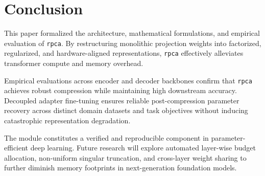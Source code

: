 \section{Conclusion}
This paper formalized the architecture, mathematical formulations, and empirical evaluation of \texttt{rpca}. By restructuring monolithic projection weights into factorized, regularized, and hardware-aligned representations, \texttt{rpca} effectively alleviates transformer compute and memory overhead.

Empirical evaluations across encoder and decoder backbones confirm that \texttt{rpca} achieves robust compression while maintaining high downstream accuracy. Decoupled adapter fine-tuning ensures reliable post-compression parameter recovery across distinct domain datasets and task objectives without inducing catastrophic representation degradation.

The module constitutes a verified and reproducible component in parameter-efficient deep learning. Future research will explore automated layer-wise budget allocation, non-uniform singular truncation, and cross-layer weight sharing to further diminish memory footprints in next-generation foundation models.
